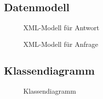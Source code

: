 
\clearpage

\subsection{Datenmodell}
\label{app:Datenmodell}
\begin{figure}[h]
    \centering
    \caption{XML-Modell für Antwort}        
\end{figure}
\begin{figure}[!htb]
    \centering
    \caption{XML-Modell für Anfrage}
\end{figure}
\clearpage


\clearpage

% 
% 

% 

\subsection{Klassendiagramm}
\label{app:Klassendiagramm}
\begin{figure}[!htb]
\centering
{}
\caption{Klassendiagramm}
\end{figure}
\clearpage


